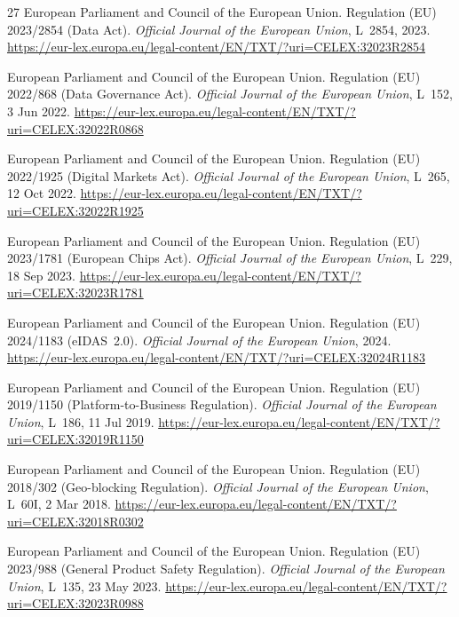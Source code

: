 \documentclass[11pt,a4paper]{article}
\begin{document}
\begin{thebibliography}{27}
European Parliament and Council of the European Union.
\newblock Regulation (EU) 2023/2854 (Data Act).
\newblock \emph{Official Journal of the European Union}, L~2854, 2023.
\newblock \url{https://eur-lex.europa.eu/legal-content/EN/TXT/?uri=CELEX:32023R2854}

European Parliament and Council of the European Union.
\newblock Regulation (EU) 2022/868 (Data Governance Act).
\newblock \emph{Official Journal of the European Union}, L~152, 3 Jun 2022.
\newblock \url{https://eur-lex.europa.eu/legal-content/EN/TXT/?uri=CELEX:32022R0868}

European Parliament and Council of the European Union.
\newblock Regulation (EU) 2022/1925 (Digital Markets Act).
\newblock \emph{Official Journal of the European Union}, L~265, 12 Oct 2022.
\newblock \url{https://eur-lex.europa.eu/legal-content/EN/TXT/?uri=CELEX:32022R1925}

European Parliament and Council of the European Union.
\newblock Regulation (EU) 2023/1781 (European Chips Act).
\newblock \emph{Official Journal of the European Union}, L~229, 18 Sep 2023.
\newblock \url{https://eur-lex.europa.eu/legal-content/EN/TXT/?uri=CELEX:32023R1781}

European Parliament and Council of the European Union.
\newblock Regulation (EU) 2024/1183 (eIDAS~2.0).
\newblock \emph{Official Journal of the European Union}, 2024.
\newblock \url{https://eur-lex.europa.eu/legal-content/EN/TXT/?uri=CELEX:32024R1183}

European Parliament and Council of the European Union.
\newblock Regulation (EU) 2019/1150 (Platform-to-Business Regulation).
\newblock \emph{Official Journal of the European Union}, L~186, 11 Jul 2019.
\newblock \url{https://eur-lex.europa.eu/legal-content/EN/TXT/?uri=CELEX:32019R1150}

European Parliament and Council of the European Union.
\newblock Regulation (EU) 2018/302 (Geo-blocking Regulation).
\newblock \emph{Official Journal of the European Union}, L~60I, 2 Mar 2018.
\newblock \url{https://eur-lex.europa.eu/legal-content/EN/TXT/?uri=CELEX:32018R0302}

European Parliament and Council of the European Union.
\newblock Regulation (EU) 2023/988 (General Product Safety Regulation).
\newblock \emph{Official Journal of the European Union}, L~135, 23 May 2023.
\newblock \url{https://eur-lex.europa.eu/legal-content/EN/TXT/?uri=CELEX:32023R0988}


\end{thebibliography}
\end{document}
